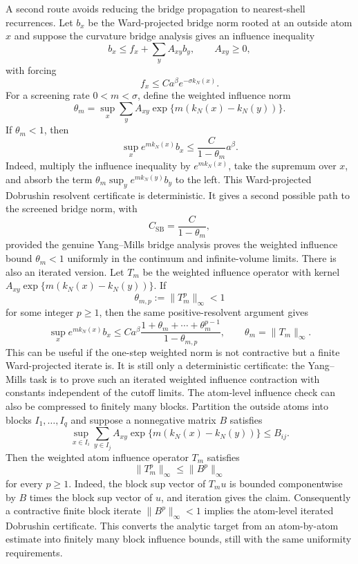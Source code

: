 A second route avoids reducing the bridge propagation to nearest-shell
recurrences. Let $b_x$ be the Ward-projected bridge norm rooted at an outside
atom $x$ and suppose the curvature bridge analysis gives an influence
inequality
\[
  b_x\leq f_x+\sum_y A_{xy}b_y,\qquad A_{xy}\geq0,
\]
with forcing
\[
  f_x\leq C a^\beta e^{-\sigma k_N(x)} .
\]
For a screening rate $0<m<\sigma$, define the weighted influence norm
\[
  \theta_m=
  \sup_x\sum_y A_{xy}\exp\{m(k_N(x)-k_N(y))\}.
\]
If $\theta_m<1$, then
\[
  \sup_x e^{m k_N(x)}b_x
  \leq
  \frac{C}{1-\theta_m}a^\beta .
\]
Indeed, multiply the influence inequality by $e^{mk_N(x)}$, take the supremum
over $x$, and absorb the term $\theta_m\sup_y e^{mk_N(y)}b_y$ to the left.
This Ward-projected Dobrushin resolvent certificate is deterministic. It gives
a second possible path to the screened bridge norm, with
\[
  C_{\mathrm{SB}}=\frac{C}{1-\theta_m},
\]
provided the genuine Yang--Mills bridge analysis proves the weighted influence
bound $\theta_m<1$ uniformly in the continuum and infinite-volume limits.
There is also an iterated version. Let $T_m$ be the weighted influence operator
with kernel $A_{xy}\exp\{m(k_N(x)-k_N(y))\}$. If
\[
  \theta_{m,p}:=\|T_m^p\|_{\infty}<1
\]
for some integer $p\geq1$, then the same positive-resolvent argument gives
\[
  \sup_x e^{m k_N(x)}b_x
  \leq
  C a^\beta
  \frac{1+\theta_m+\cdots+\theta_m^{p-1}}{1-\theta_{m,p}},
  \qquad \theta_m=\|T_m\|_\infty .
\]
This can be useful if the one-step weighted norm is not contractive but a
finite Ward-projected iterate is. It is still only a deterministic certificate:
the Yang--Mills task is to prove such an iterated weighted influence
contraction with constants independent of the cutoff limits.
The atom-level influence check can also be compressed to finitely many blocks.
Partition the outside atoms into blocks $I_1,\ldots,I_q$ and suppose a
nonnegative matrix $B$ satisfies
\[
  \sup_{x\in I_i}\sum_{y\in I_j}
  A_{xy}\exp\{m(k_N(x)-k_N(y))\}\leq B_{ij}.
\]
Then the weighted atom influence operator $T_m$ satisfies
\[
  \|T_m^p\|_\infty\leq \|B^p\|_\infty
\]
for every $p\geq1$. Indeed, the block sup vector of $T_mu$ is bounded
componentwise by $B$ times the block sup vector of $u$, and iteration gives the
claim. Consequently a contractive finite block iterate $\|B^p\|_\infty<1$
implies the atom-level iterated Dobrushin certificate. This converts the
analytic target from an atom-by-atom estimate into finitely many block
influence bounds, still with the same uniformity requirements.

